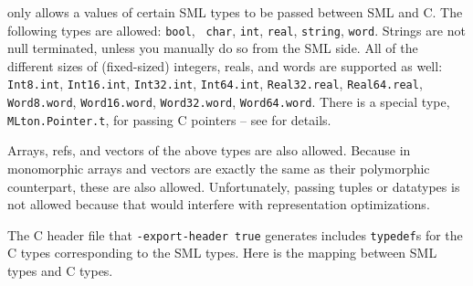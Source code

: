 {\mlton} only allows a values of certain SML types to be passed
between SML and C.  The following types are allowed: {\tt bool}, {\tt
char}, {\tt int}, {\tt real}, {\tt string}, {\tt word}.  Strings are
not null terminated, unless you manually do so from the SML side.  All
of the different sizes of (fixed-sized) integers, reals, and words are
supported as well: {\tt Int8.int}, {\tt Int16.int}, {\tt Int32.int},
{\tt Int64.int}, {\tt Real32.real}, {\tt Real64.real}, {\tt
Word8.word}, {\tt Word16.word}, {\tt Word32.word}, {\tt Word64.word}.
There is a special type, {\tt MLton.Pointer.t}, for passing C pointers
-- see  for details.

Arrays, refs, and vectors of the above types are also allowed.
Because in {\mlton} monomorphic arrays and vectors are exactly the
same as their polymorphic counterpart, these are also allowed.
Unfortunately, passing tuples or datatypes is not allowed because that
would interfere with representation optimizations.

The C header file that {\tt -export-header true} generates includes
{\tt typedef}s for the C types corresponding to the SML types.  Here
is the mapping between SML types and C types.


